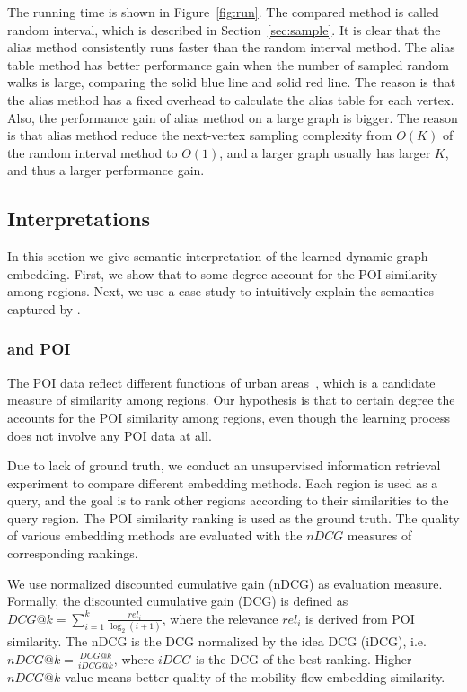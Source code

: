 The running time is shown in Figure~\ref{fig:run}. The compared method is called random interval, which is described in Section~\ref{sec:sample}. It is clear that the alias method consistently runs faster than the random interval method. The alias table method has better performance gain when the number of sampled random walks is large, comparing the solid blue line and solid red line. The reason is that the alias method has a fixed overhead to calculate the alias table for each vertex. Also, the performance gain of alias method on a large graph is bigger. The reason is that alias method reduce the next-vertex sampling complexity from $O(K)$ of the random interval method to $O(1)$, and a larger graph usually has larger $K$, and thus a larger performance gain. 




\subsection{Interpretations}

In this section we give semantic interpretation of the learned dynamic graph embedding. First, we show that \hdge to some degree account for the POI similarity among regions. Next, we use a case study to intuitively explain the semantics captured by \hdge.



\subsubsection{\hdge and POI}

The POI data reflect different functions of urban areas~\cite{yuan2012discovering}, which is a candidate measure of similarity among regions. Our hypothesis is that to certain degree the \hdge accounts for the POI similarity among regions, even though the \hdge learning process does not involve any POI data at all. 

Due to lack of ground truth, we conduct an unsupervised information retrieval experiment to compare different embedding methods. Each region is used as a query, and the goal is to rank other regions according to their similarities to the query region. The POI similarity ranking is used as the ground truth. The quality of various embedding methods are evaluated with the $nDCG$ measures of corresponding rankings.

We use normalized discounted cumulative gain (nDCG) as evaluation measure. Formally, the discounted cumulative gain (DCG) is defined as $DCG@k = \sum_{i=1}^k\frac{rel_i}{\log_2 (i+1)}$, where the relevance $rel_i$ is derived from POI similarity. The nDCG is the DCG normalized by the idea DCG (iDCG), i.e. $nDCG@k = \frac{DCG@k}{iDCG@k}$, 
where $iDCG$ is the DCG of the best ranking. Higher $nDCG@k$ value means better quality of the mobility flow embedding similarity.


